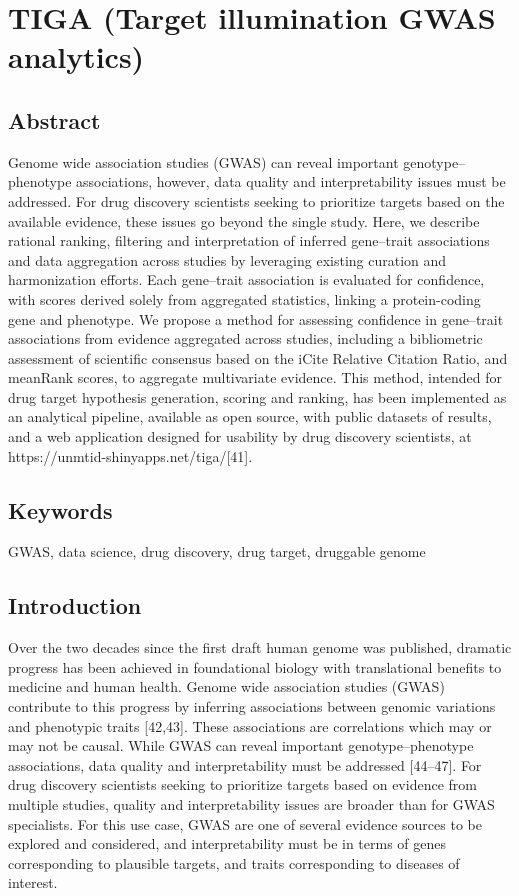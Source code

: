 \chapter{TIGA (Target illumination GWAS analytics)}

\section{Abstract}

Genome wide association studies (GWAS) can reveal important genotype–phenotype associations, however, data quality and interpretability issues must be addressed. For drug discovery scientists seeking to prioritize targets based on the available evidence, these issues go beyond the single study. Here, we describe rational ranking, filtering and interpretation of inferred gene–trait associations and data aggregation across studies by leveraging existing curation and harmonization efforts. Each gene–trait association is evaluated for confidence, with scores derived solely from aggregated statistics, linking a protein-coding gene and phenotype. We propose a method for assessing confidence in gene–trait associations from evidence aggregated across studies, including a bibliometric assessment of scientific consensus based on the iCite Relative Citation Ratio, and meanRank scores, to aggregate multivariate evidence. This method, intended for drug target hypothesis generation, scoring and ranking, has been implemented as an analytical pipeline, available as open source, with public datasets of results, and a web application designed for usability by drug discovery scientists, at https://unmtid-shinyapps.net/tiga/[41].

\section{Keywords}

GWAS, data science, drug discovery, drug target, druggable genome

\section{Introduction}

Over the two decades since the first draft human genome was published, dramatic progress has been achieved in foundational biology with translational benefits to medicine and human health. Genome wide association studies (GWAS) contribute to this progress by inferring associations between genomic variations and phenotypic traits [42,43]. These associations are correlations which may or may not be causal. While GWAS can reveal important genotype–phenotype associations, data quality and interpretability must be addressed [44–47].  For drug discovery scientists seeking to prioritize targets based on evidence from multiple studies, quality and interpretability issues are broader than for GWAS specialists. For this use case, GWAS are one of several evidence sources to be explored and considered, and interpretability must be in terms of genes corresponding to plausible targets, and traits corresponding to diseases of interest.

